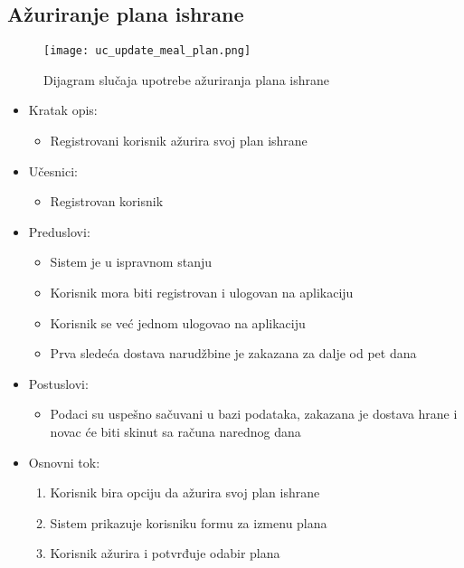 \subsection{Ažuriranje plana ishrane}

\begin{figure}[H]
\begin{center}
\texttt{[image: uc\_update\_meal\_plan.png]}
\end{center}
    \caption{Dijagram slučaja upotrebe ažuriranja plana ishrane}
\label{fig:UCUpdateMealPlan}
\end{figure}

\begin{itemize}
    \item Kratak opis:
        \begin{itemize}
            \item Registrovani korisnik ažurira svoj plan ishrane 
        \end{itemize}
    \item Učesnici:
        \begin{itemize}
            \item Registrovan korisnik
        \end{itemize}
    \item Preduslovi:
        \begin{itemize}
            \item Sistem je u ispravnom stanju
            \item Korisnik mora biti registrovan i ulogovan na aplikaciju
            \item Korisnik se već jednom ulogovao na aplikaciju
            \item Prva sledeća dostava narudžbine je zakazana za dalje od pet dana
        \end{itemize}
    \item Postuslovi:
        \begin{itemize}
            \item Podaci su uspešno sačuvani u bazi podataka, zakazana je dostava hrane i novac će biti skinut sa računa narednog dana
        \end{itemize}
    \item Osnovni tok:
        \begin{enumerate}
            \item Korisnik bira opciju da ažurira svoj plan ishrane
            \item Sistem prikazuje korisniku formu za izmenu plana
            \item Korisnik ažurira i potvrđuje odabir plana

\end{enumerate}
\end{itemize}
